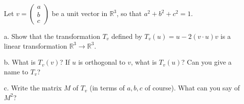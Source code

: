 \begin{exercise}{27}
    Let $v = \begin{pmatrix}
        a \\ b \\ c
    \end{pmatrix}$ be a unit vector in $\mathbb{R}^3$, so that $a^2+b^2+c^2=1$.

    a. Show that the transformation $T_v$ defined by $T_v(u) = u - 2(v \cdot u)v$ is a linear transformation $\mathbb{R}^3 \rightarrow \mathbb{R}^3$.

    b. What is $T_v(v)$? If $u$ is orthogonal to $v$, what is $T_v(u)$? Can you give a name to $T_v$?

    c. Write the matrix $M$ of $T_v$ (in terms of $a, b, c$ of course). What can you say of $M^2$?
\end{exercise}

